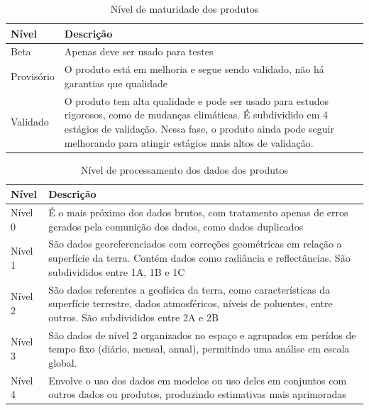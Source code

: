 \documentclass[cic,tc]{iiufrgs}
\begin{document}
\begin{table}[htbp]
\centering
\caption{Nível de maturidade dos produtos}
\begin{tabular}{ @{}lp{12cm}@{} }
  \toprule
  Nível & Descrição \\
  \midrule
  Beta & Apenas deve ser usado para testes \\
  Provisório & O produto está em melhoria e segue sendo validado, não há garantias que qualidade \\
  Validado & O produto tem alta qualidade e pode ser usado para estudos rigorosos, como de mudanças climáticas. É subdividido em 4 estágios de validação. Nessa fase, o produto ainda pode seguir melhorando para atingir estágios mais altos de validação. \\
  \bottomrule
\end{tabular}
\label{table:nivel_maturidade_produtos}
\end{table}

\begin{table}[htbp]
\centering
\caption{Nível de processamento dos dados dos produtos}
\begin{tabular}{ @{}lp{12cm}@{} }
  \toprule
  Nível & Descrição \\
  \midrule
  Nível 0 & É o mais próximo dos dados brutos, com tratamento apenas de erros gerados pela comunição dos dados, como dados duplicados \\
  Nível 1 & São dados georeferenciados com correções geométricas em relação a superfície da terra. Contém dados como radiância e reflectâncias. São subdivididos entre 1A, 1B e 1C \\
  Nível 2 & São dados referentes a geofísica da terra, como características da superfície terrestre, dados atmosféricos, níveis de poluentes, entre outros. São subdivididos entre 2A e 2B \\
  Nível 3 & São dados de nível 2 organizados no espaço e agrupados em perídos de tempo fixo (diário, mensal, anual), permitindo uma análise em escala global. \\
  Nível 4 & Envolve o uso dos dados em modelos ou uso deles em conjuntos com outros dados ou produtos, produzindo estimativas mais aprimoradas \\
  \bottomrule
\end{tabular}
\label{table:nivel_processamento_produtos}
\end{table}
\end{document}
